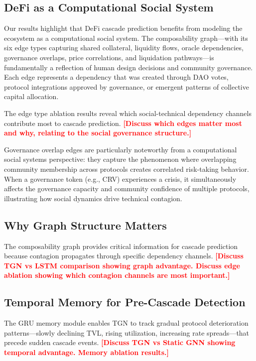 \documentclass[journal]{IEEEtran}
\newcommand{\TODO}[1]{\textcolor{red}{\textbf{[#1]}}}
\begin{document}
\subsection{DeFi as a Computational Social System}

Our results highlight that DeFi cascade prediction benefits from modeling the ecosystem as a computational social system.
The composability graph---with its six edge types capturing shared collateral, liquidity flows, oracle dependencies, governance overlaps, price correlations, and liquidation pathways---is fundamentally a reflection of human design decisions and community governance.
Each edge represents a dependency that was created through DAO votes, protocol integrations approved by governance, or emergent patterns of collective capital allocation.

The edge type ablation results reveal which social-technical dependency channels contribute most to cascade prediction.
\TODO{Discuss which edges matter most and why, relating to the social governance structure.}

Governance overlap edges are particularly noteworthy from a computational social systems perspective: they capture the phenomenon where overlapping community membership across protocols creates correlated risk-taking behavior.
When a governance token (e.g., CRV) experiences a crisis, it simultaneously affects the governance capacity and community confidence of multiple protocols, illustrating how social dynamics drive technical contagion.

\subsection{Why Graph Structure Matters}

The composability graph provides critical information for cascade prediction because contagion propagates through specific dependency channels.
\TODO{Discuss TGN vs LSTM comparison showing graph advantage. Discuss edge ablation showing which contagion channels are most important.}

\subsection{Temporal Memory for Pre-Cascade Detection}

The GRU memory module enables TGN to track gradual protocol deterioration patterns---slowly declining TVL, rising utilization, increasing rate spreads---that precede sudden cascade events.
\TODO{Discuss TGN vs Static GNN showing temporal advantage. Memory ablation results.}
\end{document}
